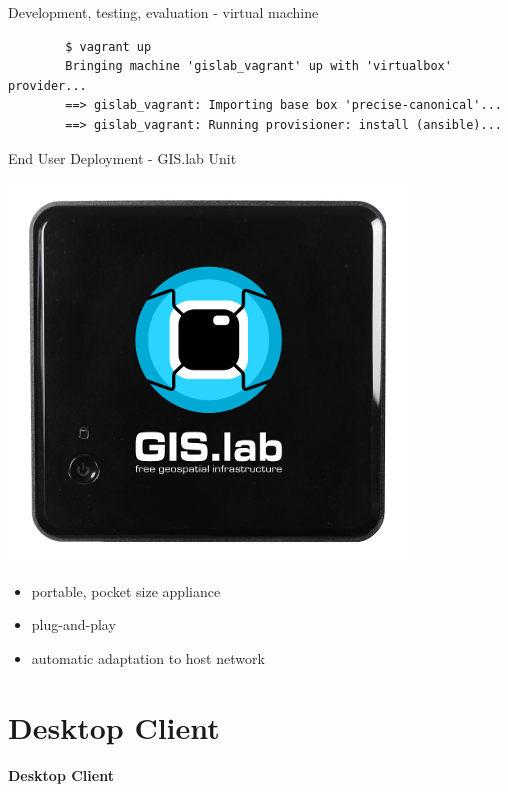 \documentclass[12pt]{beamer}
\begin{document}
\begin{frame}[fragile]{Development, testing, evaluation - virtual machine}
   \lstset{language=sh}
	\begin{lstlisting}
		$ vagrant up
		Bringing machine 'gislab_vagrant' up with 'virtualbox' provider...
		==> gislab_vagrant: Importing base box 'precise-canonical'...
		==> gislab_vagrant: Running provisioner: install (ansible)...
	\end{lstlisting}
\end{frame}

\begin{frame}{End User Deployment - GIS.lab Unit}
	\begin{center}
		\includegraphics[keepaspectratio=true,height=0.6\textheight]{images/gislab-unit.png}
	\end{center}
	\begin{itemize}
		\item portable, pocket size appliance
		\item plug-and-play
		\item automatic adaptation to host network
	\end{itemize}
\end{frame}


\section{Desktop Client}
\begin{frame}
	\begin{center}
		\LARGE\textbf{Desktop Client}	
	\end{center}
\end{frame}
\end{document}

